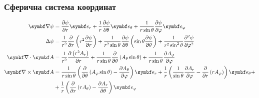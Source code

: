 \subsubsection{Сферична система координат}

\begin{align}\label{spheric}
	\vect{\nabla}\psi & = \frac{\partial \psi}{\partial r} \vect{e}_{r} + \frac{1}{r}\frac{\partial \psi}{\partial \theta} \vect{e}_{\theta} + \frac{1}{r\sin\theta}\frac{\partial \psi}{\partial \phi} \vect{e}_{\phi}                                                                                                            \\
	\Laplasian\psi    & = \frac{1}{r^2} \frac{\partial}{\partial r} \left( r^2 \frac{\partial \psi}{\partial r} \right) + \frac{1}{r^2 \sin \theta} \frac{\partial \psi}{\partial \theta} \left( \sin \theta \frac{\partial \psi}{\partial \theta} \right) + \frac{1}{r^2\sin^2 \theta} \frac{\partial^2 \psi}{\partial \varphi^2} \\
	\divg\vect{A}     & =\frac{1}{r^2}\frac{\partial \left(r^2A_r\right)}{\partial r}
	+
	\frac{1}{r\sin \theta }\frac{\partial}{\partial \theta }\left(A_{\theta }\sin \theta \right)
	+
	\frac{1}{r\sin\theta}\frac{\partial A_{\varphi}}{\partial \varphi }                                                                                                                                                                                                                                                            \\
	\rot\vect{A}      & = \frac{1}{r\sin \theta }\left(\frac{\partial}{\partial \theta }\left(A_{\varphi }\sin \theta \right)-\frac{\partial A_{\theta }}{\partial \varphi }\right)\vect{e}_{r}
	+
	\frac{1}{r}\left(\frac{1}{\sin \theta }\frac{\partial A_{r}}{\partial \varphi }-\frac{\partial}{\partial r}\left(rA_{\varphi }\right)\right)\vect{e}_{\theta}
	+ \nonumber                                                                                                                                                                                                                                                                                                                    \\
	                  & + \frac{1}{r}\left(\frac{\partial}{\partial r}\left(rA_{\theta }\right)-\frac{\partial A_{r}}{\partial \theta }\right)\vect{e}_{\phi}
\end{align}

